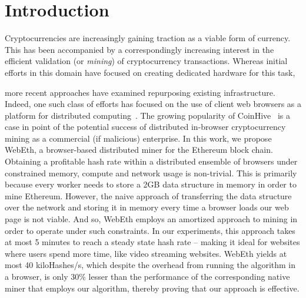 \documentclass[runningheads]{llncs}
\newcommand{\trishita}[1]{}%
\begin{document}
\section{Introduction}
Cryptocurrencies are increasingly gaining traction as a viable form of currency.  This has been accompanied by a correspondingly increasing interest in the efficient validation (or \emph{mining}) of cryptocurrency transactions.  Whereas initial efforts in this domain have focused on creating dedicated hardware for this task, %
\trishita{Add citation}
more recent approaches have examined repurposing existing infrastructure. Indeed, one such class of efforts has focused on the use of client web browsers as a platform for distributed computing~\cite{Cushing}. The growing popularity of CoinHive~\cite{coinhive} is a case in point of the potential success of distributed in-browser cryptocurrency mining as a commercial (if malicious) enterprise. In this work, we propose WebEth, a browser-based distributed miner for the Ethereum block chain. Obtaining a profitable hash rate within a distributed ensemble of browsers under constrained memory, compute and network usage is non-trivial. This is primarily because every worker needs to store a 2GB data structure in memory in order to mine Ethereum. However, the naive approach of transferring the data structure over the network and storing it in memory every time a browser loads our web page is not viable. And so, WebEth employs an amortized approach to mining in order to operate under such constraints. In our experiments, this approach takes at most 5 minutes to reach a steady state hash rate -- making it ideal for websites where users spend more time, like video streaming websites. WebEth yields at most 40 kiloHashes/s, which despite the overhead from running the algorithm in a browser, is only 30\% lesser than the performance of the corresponding native miner that employs our algorithm, thereby proving that our approach is effective.
\end{document}
